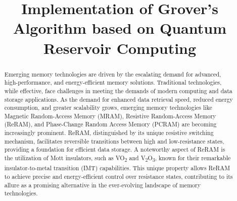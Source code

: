 \documentclass[conference]{IEEEtran}
\begin{document}
\title{ Implementation of Grover’s Algorithm based on
	Quantum Reservoir Computing  \\

}
\author{
	\and
	\and




}

\maketitle

\begin{abstract}
	Emerging memory technologies are driven by the escalating demand for advanced, high-performance, and energy-efficient memory solutions. Traditional technologies, while effective, face challenges in meeting the demands of modern computing and data storage applications. As the demand for enhanced data retrieval speed, reduced energy consumption, and greater scalability grows, emerging memory technologies like Magnetic Random-Access Memory (MRAM), Resistive Random-Access Memory (ReRAM), and Phase-Change Random Access Memory (PCRAM) are becoming increasingly prominent. ReRAM, distinguished by its unique resistive switching mechanism, facilitates reversible transitions between high and low-resistance states, providing a foundation for efficient data storage. A noteworthy aspect of ReRAM is the utilization of Mott insulators, such as VO\textsubscript{2} and V\textsubscript{2}O\textsubscript{3}, known for their remarkable insulator-to-metal transition (IMT) capabilities. This unique property allows ReRAM to achieve precise and energy-efficient control over resistance states, contributing to its allure as a promising alternative in the ever-evolving landscape of memory technologies.
\end{abstract}
\end{document}
